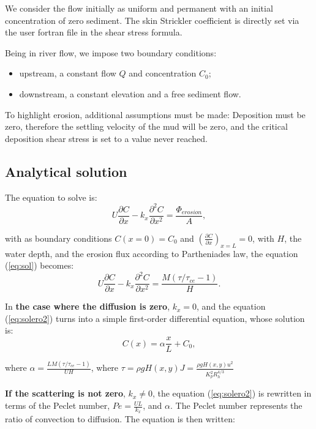 We consider the flow initially as uniform and permanent with an initial
concentration of zero sediment. The skin Strickler coefficient is
directly set via the user fortran file in the shear stress formula.

Being in river flow, we impose two boundary conditions:

\begin{itemize}
\item upstream, a constant flow $Q$ and concentration $C_0$;
\item downstream, a constant elevation and a free sediment flow.
\end{itemize}

To highlight erosion, additional assumptions must be made: Deposition
must be zero, therefore the settling velocity of the mud will be zero,
and the critical deposition shear stress is set to a value never
reached.

\subsection{Analytical solution}

The equation to solve is:
\begin{equation}
U \frac{\partial C}{\partial x} - k_x \frac{\partial^2 C}{\partial x^2} =
\frac{ \Phi_{erosion}}{ A},
\label{eq:sol}
\end{equation}

with as boundary conditions $C(x=0)=C_0$ and
$\left( \frac{\partial C}{\partial x} \right)_{x=L}=0$,
with $H$, the water depth, and the erosion flux according to
Partheniades law, the equation (\ref{eq:sol}) becomes:
\begin{equation}
U \frac{\partial C}{\partial x} - k_x \frac{\partial^2 C}{\partial x^2} =
\frac{ M (\tau/\tau_{ce}-1)}{ H}.
\label{eq:solero2}
\end{equation}

In \textbf{the case where the diffusion is zero}, $k_x=0 $, and the
equation (\ref{eq:solero2}) turns into a simple first-order
differential equation, whose solution is:
\begin{equation}
C(x)=\alpha \frac{x}{L}+ C_0,
\label{eq:sol3}
\end{equation}

where $ \alpha = \frac{LM (\tau/\tau_{ce}-1) }{UH} $,
where
$\tau= \rho g H(x,y) J = \frac{\rho g H(x,y) u^2}{K_p^2 R_h^{4/3}}$

\textbf{If the scattering is not zero}, $k_x\neq 0$, the equation
(\ref{eq:solero2}) is rewritten in terms of the Peclet number,
$Pe=\frac{UL}{k_x}$, and $\alpha$. The Peclet number represents
the ratio of convection to diffusion. The equation is then written:

